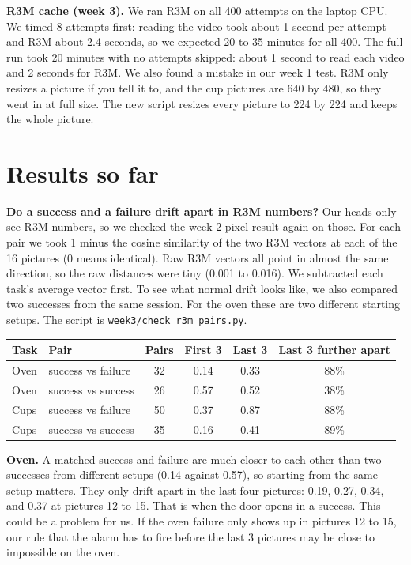 \documentclass{article}
\begin{document}
\textbf{R3M cache (week 3).} We ran R3M on all 400 attempts on the laptop CPU. We timed 8 attempts first: reading the video took about 1 second per attempt and R3M about 2.4 seconds, so we expected 20 to 35 minutes for all 400. The full run took 20 minutes with no attempts skipped: about 1 second to read each video and 2 seconds for R3M. We also found a mistake in our week 1 test. R3M only resizes a picture if you tell it to, and the cup pictures are 640 by 480, so they went in at full size. The new script resizes every picture to 224 by 224 and keeps the whole picture.

\section{Results so far}\label{sec:results}
\textbf{Do a success and a failure drift apart in R3M numbers?} Our heads only see R3M numbers, so we checked the week 2 pixel result again on those. For each pair we took 1 minus the cosine similarity of the two R3M vectors at each of the 16 pictures (0 means identical). Raw R3M vectors all point in almost the same direction, so the raw distances were tiny (0.001 to 0.016). We subtracted each task's average vector first. To see what normal drift looks like, we also compared two successes from the same session. For the oven these are two different starting setups. The script is \texttt{week3/check\_r3m\_pairs.py}.

\begin{center}
\begin{tabular}{llcccc}
\hline
Task & Pair & Pairs & First 3 & Last 3 & Last 3 further apart \\
\hline
Oven & success vs failure & 32 & 0.14 & 0.33 & 88\% \\
Oven & success vs success & 26 & 0.57 & 0.52 & 38\% \\
Cups & success vs failure & 50 & 0.37 & 0.87 & 88\% \\
Cups & success vs success & 35 & 0.16 & 0.41 & 89\% \\
\hline
\end{tabular}
\end{center}

\textbf{Oven.} A matched success and failure are much closer to each other than two successes from different setups (0.14 against 0.57), so starting from the same setup matters. They only drift apart in the last four pictures: 0.19, 0.27, 0.34, and 0.37 at pictures 12 to 15. That is when the door opens in a success. This could be a problem for us. If the oven failure only shows up in pictures 12 to 15, our rule that the alarm has to fire before the last 3 pictures may be close to impossible on the oven.
\end{document}
